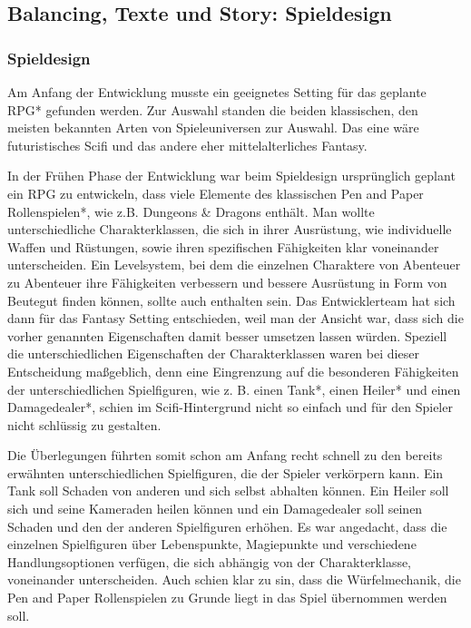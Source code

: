 

\subsection{Balancing, Texte und Story: Spieldesign}



\subsubsection{Spieldesign} Am Anfang der Entwicklung musste ein geeignetes Setting für das geplante RPG* gefunden werden. Zur Auswahl standen die beiden klassischen, den meisten bekannten Arten von Spieleuniversen zur Auswahl. Das eine wäre futuristisches Scifi und das andere eher mittelalterliches Fantasy. 

In der Frühen Phase der Entwicklung war beim Spieldesign ursprünglich geplant ein RPG zu entwickeln, dass viele Elemente des klassischen Pen and Paper Rollenspielen*, wie z.B. Dungeons \& Dragons enthält. Man wollte unterschiedliche Charakterklassen, die sich in ihrer Ausrüstung, wie individuelle Waffen und Rüstungen, sowie ihren spezifischen Fähigkeiten klar voneinander unterscheiden. Ein Levelsystem, bei dem die einzelnen Charaktere von Abenteuer zu Abenteuer ihre Fähigkeiten verbessern und bessere Ausrüstung in Form von Beutegut finden können, sollte auch enthalten sein. Das Entwicklerteam hat sich dann für das Fantasy Setting entschieden, weil man der Ansicht war, dass sich die vorher genannten Eigenschaften damit besser umsetzen lassen würden. Speziell die unterschiedlichen Eigenschaften der Charakterklassen waren bei dieser Entscheidung maßgeblich, denn eine Eingrenzung auf die besonderen Fähigkeiten der unterschiedlichen Spielfiguren, wie z. B. einen Tank*, einen Heiler* und einen Damagedealer*, schien im Scifi-Hintergrund nicht so einfach und für den Spieler nicht schlüssig zu gestalten.

Die Überlegungen führten somit schon am Anfang recht schnell zu den bereits erwähnten unterschiedlichen Spielfiguren, die der Spieler verkörpern kann. Ein Tank soll Schaden von anderen und sich selbst abhalten können. Ein Heiler soll sich und seine Kameraden heilen können und ein Damagedealer soll seinen Schaden und den der anderen Spielfiguren erhöhen. Es war angedacht, dass die einzelnen Spielfiguren über Lebenspunkte, Magiepunkte und verschiedene Handlungsoptionen verfügen, die sich abhängig von der Charakterklasse, voneinander unterscheiden. Auch schien klar zu sin, dass die Würfelmechanik, die Pen and Paper Rollenspielen zu Grunde liegt in das Spiel übernommen werden soll.

